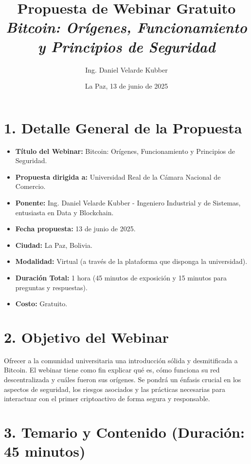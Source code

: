 \documentclass[12pt,a4paper]{article}
\title{
    \vspace{2cm}
    \textbf{Propuesta de Webinar Gratuito} \\
    \large \textit{Bitcoin: Orígenes, Funcionamiento y Principios de Seguridad}
    \vspace{1.5cm}
}
\author{Ing. Daniel Velarde Kubber}
\date{La Paz, 13 de junio de 2025}
\begin{document}
\maketitle
\thispagestyle{empty}
\clearpage

\section*{1. Detalle General de la Propuesta}

\begin{itemize}
    \item \textbf{Título del Webinar:} Bitcoin: Orígenes, Funcionamiento y Principios de Seguridad.
    \item \textbf{Propuesta dirigida a:} Universidad Real de la Cámara Nacional de Comercio.
    \item \textbf{Ponente:} Ing. Daniel Velarde Kubber - Ingeniero Industrial y de Sistemas, entusiasta en Data y Blockchain.
    \item \textbf{Fecha propuesta:} 13 de junio de 2025.
    \item \textbf{Ciudad:} La Paz, Bolivia.
    \item \textbf{Modalidad:} Virtual (a través de la plataforma que disponga la universidad).
    \item \textbf{Duración Total:} 1 hora (45 minutos de exposición y 15 minutos para preguntas y respuestas).
    \item \textbf{Costo:} Gratuito.
\end{itemize}

\section*{2. Objetivo del Webinar}

Ofrecer a la comunidad universitaria una introducción sólida y desmitificada a Bitcoin. El webinar tiene como fin explicar qué es, cómo funciona su red descentralizada y cuáles fueron sus orígenes. Se pondrá un énfasis crucial en los aspectos de seguridad, los riesgos asociados y las prácticas necesarias para interactuar con el primer criptoactivo de forma segura y responsable.

\section*{3. Temario y Contenido (Duración: 45 minutos)}
\end{document}
